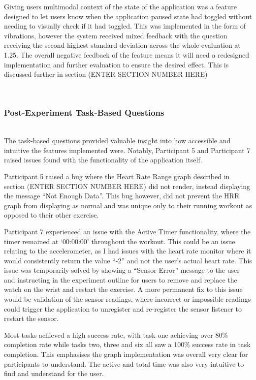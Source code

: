 \documentclass{l4proj}
\begin{document}
Giving users multimodal context of the state of the application was a feature designed to let users know when the application paused state had toggled without needing to visually check if it had toggled. This was implemented in the form of vibrations, however the system received mixed feedback with the question receiving the second-highest standard deviation across the whole evaluation at 1.25. The overall negative feedback of the feature means it will need a redesigned implementation and further evaluation to ensure the desired effect. This is discussed further in section (ENTER SECTION NUMBER HERE)

\noindent\mbox{}\\
\subsubsection{Post-Experiment Task-Based Questions}
\noindent\mbox{}\\

The task-based questions provided valuable insight into how accessible and intuitive the features implemented were. Notably, Participant 5 and Participant 7 raised issues found with the functionality of the application itself. 

Participant 5 raised a bug where the Heart Rate Range graph described in section (ENTER SECTION NUMBER HERE) did not render, instead displaying the message “Not Enough Data”. This bug however, did not prevent the HRR graph from displaying as normal and was unique only to their running workout as opposed to their other exercise. 

Participant 7 experienced an issue with the Active Timer functionality, where the timer remained at ‘00:00:00’ throughout the workout. This could be an issue relating to the accelerometer, as I had issues with the heart rate monitor where it would consistently return the value “-2” and not the user’s actual heart rate. This issue was temporarily solved by showing a “Sensor Error” message to the user and instructing in the experiment outline for users to remove and replace the watch on the wrist and restart the exercise. A more permanent fix to this issue would be validation of the sensor readings, where incorrect or impossible readings could trigger the application to unregister and re-register the sensor listener to restart the sensor.

Most tasks achieved a high success rate, with task one achieving over 80\% completion rate while tasks two, three and six all saw a 100\% success rate in task completion. This emphasises the graph implementation was overall very clear for participants to understand. The active and total time was also very intuitive to find and understand for the user.
\end{document}
